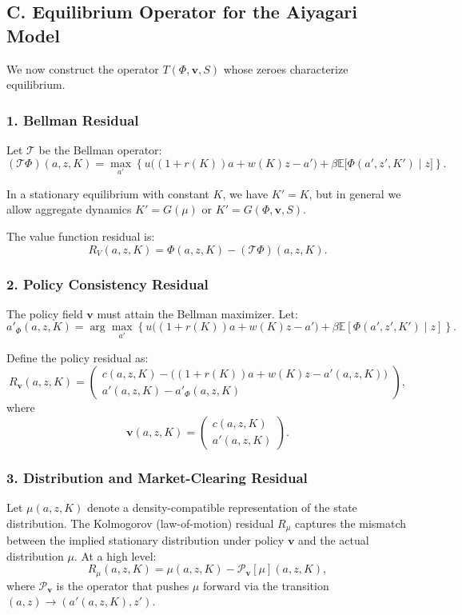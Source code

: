 \documentclass[12pt]{article}
\begin{document}
\subsection*{C. Equilibrium Operator for the Aiyagari Model}

We now construct the operator $T(\Phi,\mathbf{v},S)$ whose zeroes
characterize equilibrium.

\subsubsection*{1. Bellman Residual}

Let $\mathcal{T}$ be the Bellman operator:
\[
(\mathcal{T}\Phi)(a,z,K)
=
\max_{a'}
\left\{
    u\big((1+r(K))a + w(K)z - a'\big)
    + \beta \mathbb{E}\big[\Phi(a',z',K') \mid z\big]
\right\}.
\]

In a stationary equilibrium with constant $K$, we have $K' = K$, but in
general we allow aggregate dynamics $K' = G(\mu)$ or $K' = G(\Phi,\mathbf{v},S)$.

The value function residual is:
\[
R_V(a,z,K)
=
\Phi(a,z,K) - (\mathcal{T}\Phi)(a,z,K).
\]

\subsubsection*{2. Policy Consistency Residual}

The policy field $\mathbf{v}$ must attain the Bellman maximizer. Let:
\[
a'_\Phi(a,z,K) = 
\arg\max_{a'}
\left\{
    u\big((1+r(K))a + w(K)z - a'\big)
    + \beta \mathbb{E}[\Phi(a',z',K')\mid z]
\right\}.
\]

Define the policy residual as:
\[
R_{\mathbf{v}}(a,z,K)
=
\begin{pmatrix}
c(a,z,K) - \big((1+r(K))a + w(K)z - a'(a,z,K)\big) \\
a'(a,z,K) - a'_\Phi(a,z,K)
\end{pmatrix},
\]
where
\[
\mathbf{v}(a,z,K) =
\begin{pmatrix}
c(a,z,K) \\
a'(a,z,K)
\end{pmatrix}.
\]

\subsubsection*{3. Distribution and Market-Clearing Residual}

Let $\mu(a,z,K)$ denote a density-compatible representation of the
state distribution. The Kolmogorov (law-of-motion) residual $R_\mu$
captures the mismatch between the implied stationary distribution under
policy $\mathbf{v}$ and the actual distribution $\mu$. At a high level:
\[
R_\mu(a,z,K)
=
\mu(a,z,K)
-
\mathcal{P}_{\mathbf{v}}[\mu](a,z,K),
\]
where $\mathcal{P}_{\mathbf{v}}$ is the operator that pushes $\mu$
forward via the transition $(a,z) \to (a'(a,z,K),z')$.
\end{document}
